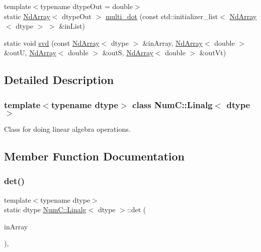 \begin{DoxyCompactItemize}
\item 
{\footnotesize template$<$typename dtype\+Out  = double$>$ }\\static \mbox{\hyperlink{class_num_c_1_1_nd_array}{Nd\+Array}}$<$ dtype\+Out $>$ \mbox{\hyperlink{class_num_c_1_1_linalg_a27f2745847b1685b2ebe6ca030174528}{multi\+\_\+dot}} (const std\+::initializer\+\_\+list$<$ \mbox{\hyperlink{class_num_c_1_1_nd_array}{Nd\+Array}}$<$ dtype $>$ $>$ \&in\+List)
\item 
static void \mbox{\hyperlink{class_num_c_1_1_linalg_ad7d0c5294d6c7e869ebba12d10519645}{svd}} (const \mbox{\hyperlink{class_num_c_1_1_nd_array}{Nd\+Array}}$<$ dtype $>$ \&in\+Array, \mbox{\hyperlink{class_num_c_1_1_nd_array}{Nd\+Array}}$<$ double $>$ \&outU, \mbox{\hyperlink{class_num_c_1_1_nd_array}{Nd\+Array}}$<$ double $>$ \&outS, \mbox{\hyperlink{class_num_c_1_1_nd_array}{Nd\+Array}}$<$ double $>$ \&out\+Vt)
\end{DoxyCompactItemize}


\subsection{Detailed Description}
\subsubsection*{template$<$typename dtype$>$\newline
class Num\+C\+::\+Linalg$<$ dtype $>$}

Class for doing linear algebra operations. 

\subsection{Member Function Documentation}
\mbox{\label{class_num_c_1_1_linalg_a72b53511efc570e3b030cbc6e549be91}} 
\subsubsection{\texorpdfstring{det()}{det()}}
{\footnotesize\ttfamily template$<$typename dtype$>$ \\
static dtype \mbox{\hyperlink{class_num_c_1_1_linalg}{Num\+C\+::\+Linalg}}$<$ dtype $>$\+::det (\begin{DoxyParamCaption}\item[{const \mbox{\hyperlink{class_num_c_1_1_nd_array}{Nd\+Array}}$<$ dtype $>$ \&}]{in\+Array }\end{DoxyParamCaption})\hspace{0.3cm}{\ttfamily [inline]}, {\ttfamily [static]}}

